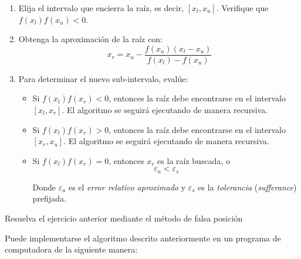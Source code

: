 \begin{enumerate}
    
    \item Elija el intervalo que encierra la raíz, es decir, $[x_l, x_u]$.
        Verifique que $f(x_l)f(x_u) < 0$.

    \item Obtenga la aproximación de la raíz con:
        \begin{equation*}
            x_r = x_u - \frac{f(x_u)(x_l-x_u)}{f(x_l) - f(x_u)}
        \end{equation*}

    \item Para determinar el nuevo sub-intervalo, evalúe:
        \begin{itemize}
            \item Si $f(x_l)f(x_r) < 0$, entonces la raíz debe
                encontrarse en el intervalo $[x_l, x_r]$. El
                algoritmo se seguirá ejecutando de manera
                recursiva.
            \item Si $f(x_l)f(x_r) > 0$, entonces la raíz debe
                encontrarse en el intervalo $[x_r, x_u]$. El
                algoritmo se seguirá ejecutando de manera
                recursiva.

            \item Si $f(x_l) f(x_r) = 0$, entonces $x_r$ es la raíz
                buscada, o
                \[
                    \varepsilon_a < \varepsilon_s
                \]

                Donde $\varepsilon_a$ es el \emph{error relativo aproximado} y
                $\varepsilon_s$ es la \emph{tolerancia} (\textit{sufferance})
                prefijada.
        \end{itemize}
\end{enumerate}

\begin{ex}
    Resuelva el ejercicio anterior mediante el método de falsa posición
    
    \begin{solution}

        Puede implementarse el algoritmo descrito anteriormente en un
        programa de computadora de la siguiente manera:

        

        
    \end{solution}
\end{ex}


